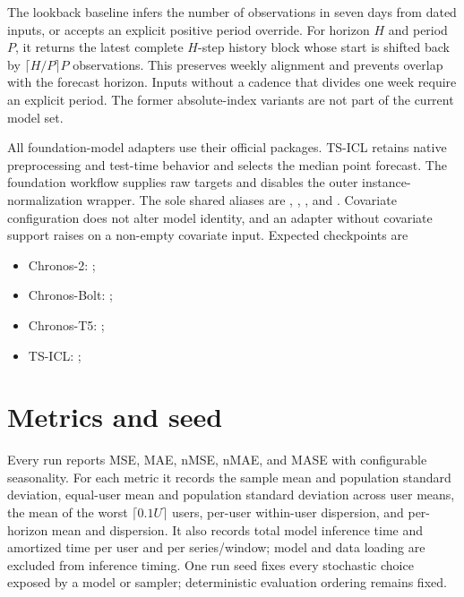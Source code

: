 \documentclass[10pt,a4paper]{article}
\newcommand{\code}[1]{\texttt{\detokenize{#1}}}
\begin{document}
The lookback baseline infers the number of observations in seven days from
dated inputs, or accepts an explicit positive period override. For horizon
$H$ and period $P$, it returns the latest complete $H$-step history block whose
start is shifted back by $\lceil H/P\rceil P$ observations. This preserves
weekly alignment and prevents overlap with the forecast horizon. Inputs without
a cadence that divides one week require an explicit period. The former
absolute-index variants are not part of the current model set.

All foundation-model adapters use their official packages. TS-ICL retains
native preprocessing and test-time behavior and selects the median point
forecast. The foundation workflow supplies raw targets and disables the outer
instance-normalization wrapper. The sole shared aliases are
\code{chronos2}, \code{chronos_bolt}, \code{chronos_t5}, and
\code{ts_icl}. Covariate configuration does not alter model identity, and
an adapter without covariate support raises on a non-empty covariate input.
Expected checkpoints are
\begin{itemize}
  \item Chronos-2: ;
  \item Chronos-Bolt: ;
  \item Chronos-T5: ;
  \item TS-ICL: ;
\end{itemize}

\section{Metrics and seed}
Every run reports MSE, MAE, nMSE, nMAE, and MASE with configurable seasonality.
For each metric it records the sample mean and population standard deviation,
equal-user mean and population standard deviation across user means, the mean
of the worst $\lceil0.1U\rceil$ users, per-user within-user dispersion, and
per-horizon mean and dispersion. It also records total model inference time and
amortized time per user and per series/window; model and data loading are
excluded from inference timing. One run seed fixes every stochastic choice
exposed by a model or sampler; deterministic evaluation ordering remains fixed.
\end{document}
